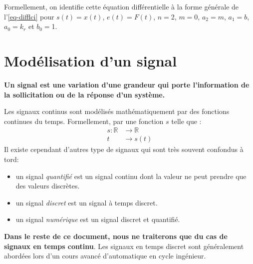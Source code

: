 Formellement, on identifie cette équation différentielle à la forme générale 
de l'\cref{eq-difflci} pour $s(t)=x(t)$, $e(t)=F(t)$, 
$n=$2, $m=0$, $a_2=m$, $a_1=b$, $a_0=k_r$ et $b_0=$1.
\section{Modélisation d'un signal}
\textbf{Un signal est une variation d'une grandeur qui porte l'information 
de la sollicitation ou de la réponse d'un système.}

Les signaux continus sont modélisés mathématiquement par des fonctions 
continues du temps. Formellement, par une fonction $s$ telle que :
\begin{align*}
s : \mathbb{R}&\rightarrow\mathbb{R} \\  
t&\rightarrow s(t) 
\end{align*}    
Il existe cependant d'autres type de signaux qui sont très souvent confondus 
à tord:
\begin{itemize}
    \item un signal \emph{quantifié} est un signal continu 
          dont la valeur ne peut prendre que des valeurs discrètes. 
    \item un signal \emph{discret} est un signal à temps discret.
    \item un signal \emph{numérique} est un signal discret et quantifié.   
\end{itemize}
\textbf{Dans le reste de ce document, nous ne traiterons que
du cas de signaux en temps continu}. Les signaux en temps discret
sont généralement abordées lors d'un cours 
avancé d'automatique en cycle ingénieur.
